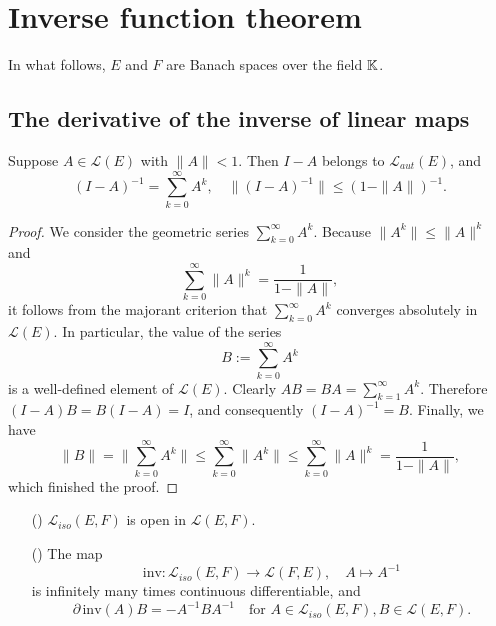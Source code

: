 \section{Inverse function theorem}
In what follows, $E$ and $F$ are Banach spaces over the field $\mathbb{K}$.
\subsection{The derivative of the inverse of linear maps}
\begin{proposition}\label{inv linear map}
Suppose $A\in\mathcal{L}(E)$ with $\|A\|<1$. Then $I-A$ belongs to $\mathcal{L}_{aut}(E)$, and
\[(I-A)^{-1}=\sum_{k=0}^{\infty}A^k,\quad \|(I-A)^{-1}\|\leq (1-\|A\|)^{-1}.\]
\end{proposition}
\begin{proof}
We consider the geometric series $\sum_{k=0}^{\infty}A^k$. Because $\|A^k\|\leq\|A\|^k$ and 
\[\sum_{k=0}^{\infty}\|A\|^k=\frac{1}{1-\|A\|},\]
it follows from the majorant criterion that $\sum_{k=0}^{\infty}A^k$ converges absolutely in $\mathcal{L}(E)$. In particular, the value of the series
\[B:=\sum_{k=0}^{\infty}A^k\]
is a well-defined element of $\mathcal{L}(E)$. Clearly $AB=BA=\sum_{k=1}^{\infty}A^k$. Therefore $(I-A)B=B(I-A)=I$, and consequently $(I-A)^{-1}=B$. Finally, we have
\[\|B\|=\|\sum_{k=0}^{\infty}A^k\|\leq\sum_{k=0}^{\infty}\|A^k\|\leq\sum_{k=0}^{\infty}\|A\|^k=\frac{1}{1-\|A\|},\]
which finished the proof.
\end{proof}
\begin{proposition}\label{inv diff}
\mbox{}
\begin{itemize}
\item[(\rmnum{1})]$\mathcal{L}_{iso}(E,F)$ is open in $\mathcal{L}(E,F)$.
\item[(\rmnum{2})]The map
\[\mathrm{inv}:\mathcal{L}_{iso}(E,F)\to\mathcal{L}(F,E),\quad A\mapsto A^{-1}\]
is infinitely many times continuous differentiable, and
\begin{equation}\label{inv diff-1}
\partial\,\mathrm{inv}(A)B=-A^{-1}BA^{-1}\quad\text{for }A\in\mathcal{L}_{iso}(E,F),B\in\mathcal{L}(E,F).
\end{equation}
\end{itemize}
\end{proposition}
